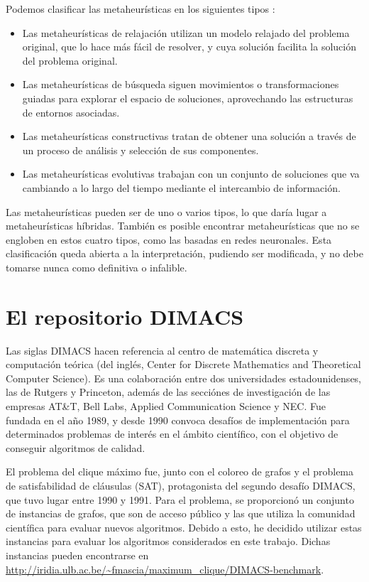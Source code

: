 Podemos clasificar las metaheurísticas en los siguientes tipos \citep{melian:2003}:
\begin{itemize}
  \item Las metaheurísticas de relajación utilizan un modelo relajado del problema
        original, que lo hace más fácil de resolver, y cuya solución facilita la
        solución del problema original.

  \item Las metaheurísticas de búsqueda siguen movimientos o transformaciones guiadas
        para explorar el espacio de soluciones, aprovechando las estructuras de
        entornos asociadas.

  \item Las metaheurísticas constructivas tratan de obtener una solución a través
        de un proceso de análisis y selección de sus componentes.

  \item Las metaheurísticas evolutivas trabajan con un conjunto de soluciones que
        va cambiando a lo largo del tiempo mediante el intercambio de información.
\end{itemize}

Las metaheurísticas pueden ser de uno o varios tipos, lo que daría lugar a metaheurísticas
híbridas. También es posible encontrar metaheurísticas que no se engloben en estos
cuatro tipos, como las basadas en redes neuronales. Esta clasificación queda abierta
a la interpretación, pudiendo ser modificada, y no debe tomarse nunca como definitiva o infalible.

\section{El repositorio DIMACS}
Las siglas DIMACS hacen referencia al centro de matemática discreta y computación
teórica (del inglés, Center for Discrete Mathematics and Theoretical Computer Science).
Es una colaboración entre dos universidades estadounidenses, las de Rutgers y Princeton,
además de las secciónes de investigación de las empresas AT\&T, Bell Labs, Applied
Communication Science y NEC. Fue fundada en el año 1989, y desde 1990 convoca desafíos
de implementación para determinados problemas de interés en el ámbito científico, con
el objetivo de conseguir algoritmos de calidad.

El problema del clique máximo fue, junto con el coloreo de grafos y el problema de satisfabilidad
de cláusulas (SAT), protagonista del segundo desafío DIMACS, que tuvo lugar entre 1990 y 1991.
Para el problema, se proporcionó un conjunto de instancias de grafos, que son de acceso público
y las que utiliza la comunidad científica para evaluar nuevos algoritmos. Debido a esto, he decidido
utilizar estas instancias para evaluar los algoritmos considerados en este trabajo. Dichas instancias
pueden encontrarse en \url{http://iridia.ulb.ac.be/~fmascia/maximum_clique/DIMACS-benchmark}.

